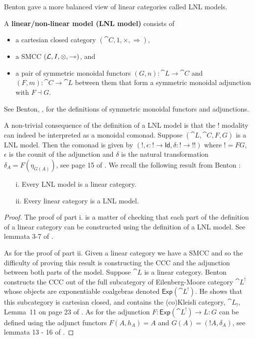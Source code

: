 Benton gave a more balanced view of linear categories called LNL
models.
\begin{definition}
  \label{def:LNL-model}
  A \textbf{linear/non-linear model (LNL model)} consists of
  \begin{itemize}
  \item a cartesian closed category $(\cat{C}, 1, \times,
    \Rightarrow)$,
  \item a SMCC $(\mathcal{L},I,\otimes,\multimap)$, and
  \item a pair of symmetric monoidal functors $(G,n) : \cat{L} \to
    \cat{C}$ and $(F,m) : \cat{C} \to \cat{L}$ between them that form
    a symmetric monoidal adjunction with $F \dashv G$.
  \end{itemize}
  See Benton, \cite{Benton:1994}, for the definitions of symmetric
  monoidal functors and adjunctions.
\end{definition}
A non-trivial consequence of the definition of a LNL model is that the
$!$ modality can indeed be interpreted as a monoidal comonad.  Suppose
$(\cat{L}, \cat{C},F,G)$ is a LNL model. Then the comonad is given by
$(\mathop{!}, \epsilon : \mathop{!} \to \mathsf{Id}, \delta :
\mathop{!} \to \mathop{!!})$
where $! = FG$, $\epsilon$ is the counit of the adjunction and
$\delta$ is the natural transformation $\delta_A = F(\eta_{G(A)})$,
see page 15 of \cite{Benton:1994}.  We recall the following result
from Benton \cite{Benton:1994}:
\begin{theorem}
  \label{thm:lnl_models_are_linear_categories}
  \begin{itemize}
  \item[]
  \item[i.] Every LNL model is a linear category.
  \item[ii.] Every linear category is a LNL model.
  \end{itemize}
\end{theorem}
\begin{proof}
  The proof of part i. is a matter of checking that each part of the
  definition of a linear category can be constructed using the
  definition of a LNL model. See lemmata 3-7 of \cite{Benton:1994}.

  As for the proof of part ii. Given a linear category we have a SMCC and so the difficulty of
  proving this result is constructing the CCC and the adjunction
  between both parts of the model.  Suppose $\cat{L}$ is a linear
  category.  Benton constructs the CCC out of the full subcategory of
  Eilenberg-Moore category $\cat{L}^!$ whose objects are exponentiable
  coalgebras denoted $\mathsf{Exp}(\cat{L}^!)$.  He shows that
  this subcategory is cartesian closed, and contains the (co)Kleisli
  category, $\cat{L}_!$, Lemma~11 on page 23 of \cite{Benton:1994}.
  As for the adjunction
  $F : \mathsf{Exp}(\cat{L}^!) \to L : G$ can be defined using the
  adjunct functors $F(A,h_A) = A$ and $G(A) = (!A,\delta_A)$, see
  lemmata 13 - 16 of \cite{Benton:1994}.
\end{proof}

